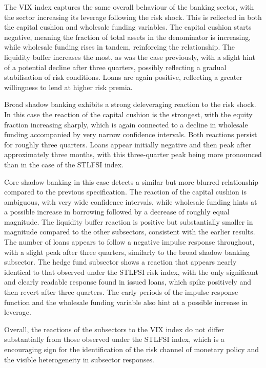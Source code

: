 \documentclass[12pt,a4paper]{report}\usepackage[a4paper, top=2.5cm, bottom=2.5cm, left=2.5cm, right=2.5cm]{geometry}
\begin{document}
The VIX index captures the same overall behaviour of the banking sector, with the sector increasing its leverage following the risk shock. This is reflected in both the capital cushion and wholesale funding variables. The capital cushion starts negative, meaning the fraction of total assets in the denominator is increasing, while wholesale funding rises in tandem, reinforcing the relationship. The liquidity buffer increases the most, as was the case previously, with a slight hint of a potential decline after three quarters, possibly reflecting a gradual stabilisation of risk conditions. Loans are again positive, reflecting a greater willingness to lend at higher risk premia.

Broad shadow banking exhibits a strong deleveraging reaction to the risk shock. In this case the reaction of the capital cushion is the strongest, with the equity fraction increasing sharply, which is again connected to a decline in wholesale funding accompanied by very narrow confidence intervals. Both reactions persist for roughly three quarters. Loans appear initially negative and then peak after approximately three months, with this three-quarter peak being more pronounced than in the case of the STLFSI index.

Core shadow banking in this case detects a similar but more blurred relationship compared to the previous specification. The reaction of the capital cushion is ambiguous, with very wide confidence intervals, while wholesale funding hints at a possible increase in borrowing followed by a decrease of roughly equal magnitude. The liquidity buffer reaction is positive but substantially smaller in magnitude compared to the other subsectors, consistent with the earlier results. The number of loans appears to follow a negative impulse response throughout, with a slight peak after three quarters, similarly to the broad shadow banking subsector.
The hedge fund subsector shows a reaction that appears nearly identical to that observed under the STLFSI risk index, with the only significant and clearly readable response found in issued loans, which spike positively and then revert after three quarters. The early periods of the impulse response function and the wholesale funding variable also hint at a possible increase in leverage.

Overall, the reactions of the subsectors to the VIX index do not differ substantially from those observed under the STLFSI index, which is a encouraging sign for the identification of the risk channel of monetary policy and the visible heterogeneity in subsector responses.
\end{document}
